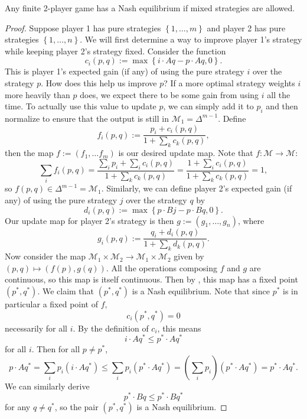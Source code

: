 \documentclass[twoside,10pt]{article}
\begin{document}
\begin{thrm}
	Any finite 2-player game has a Nash equilibrium if mixed strategies are allowed.
\end{thrm}
\begin{proof}
	Suppose player 1 has pure strategies $\left\{ 1, \dots, m \right\}$ and player 2 has pure strategies $\left\{ 1, \dots, n \right\}$. We will first determine a way to improve player 1's strategy while keeping player 2's strategy fixed. Consider the function
	\[
		c_i(p,q) := \max\left\{ i\cdot A q - p\cdot Aq, 0 \right\}.
	\] This is player 1's expected gain (if any) of using the pure strategy $i$ over the strategy $p$. How does this help us improve $p$? If a more optimal strategy weights $i$ more heavily than $p$ does, we expect there to be some gain from using $i$ all the time. To actually use this value to update $p$, we can simply add it to $p_i$ and then normalize to ensure that the output is still in $\mathcal{M}_1=\Delta^{m-1}$. Define
	\[
		f_{i}(p,q) := \frac{p_i + c_i(p,q)}{1 + \sum_{k}c_{k}(p,q)} ,
	\] then the map $f := (f_1, \dots f_{m})$ is our desired update map. Note that $f:\mathcal{M} \to \mathcal{M}$:
	\[
		\sum_{i} f_{i}(p,q) = \frac{\sum_{i} p_i + \sum_i c_i(p,q)}{1 + \sum_{k}c_{k}(p,q)} = \frac{1 + \sum_i c_i(p,q)}{1 + \sum_{k}c_{k}(p,q)} = 1,
	\] so $f(p,q) \in \Delta^{m-1}=\mathcal{M}_1$. Similarly, we can define player 2's expected gain (if any) of using the pure strategy $j$ over the strategy $q$ by
	\[
		d_{i}(p,q) := \max \left\{ p\cdot Bj - p\cdot Bq, 0 \right\}.
	\] Our update map for player 2's strategy is then $g := (g_1, \dots, g_{n})$, where
	\[
		g_{i}(p,q) := \frac{q_i + d_{i}(p,q)}{1 + \sum_{k} d_{k}(p,q)} .
	\] Now consider the map $\mathcal{M}_1 \times \mathcal{M}_2 \to \mathcal{M}_1 \times \mathcal{M}_2$ given by $(p,q) \mapsto (f(p), g(q))$. All the operations composing $f$ and $g$ are continuous, so this map is itself continuous. Then by , this map has a fixed point $(p^{*},q^{*})$. We claim that $(p^{*},q^{*})$ is a Nash equilibrium. Note that since $p^{*}$ is in particular a fixed point of $f$,
	\[
		c_i(p^{*},q^{*}) = 0
	\] necessarily for all $i$. By the definition of $c_i$, this means
	\[
	i\cdot Aq^{*} \leq p^{*}\cdot Aq^{*}
	\] for all $i$. Then for all $p \neq p^{*}$,
	\[
		p\cdot Aq^{*} = \sum_i p_i (i \cdot Aq^{*}) \leq \sum_i p_i (p^{*}\cdot Aq^{*}) = \left( \sum_i p_i \right)\left( p^{*}\cdot Aq^{*} \right) = p^{*}\cdot Aq^{*}.
	\] We can similarly derive
	\[
	p^{*}\cdot Bq \leq p^{*}\cdot Bq^{*}
	\] for any $q \neq q^{*}$, so the pair $(p^{*},q^{*})$ is a Nash equilibrium.
\end{proof}


\nocite{tutorial}
\nocite{kakutani}
\nocite{algo}
\nocite{reu}
\nocite{chicago}

\printbibliography
\end{document}
